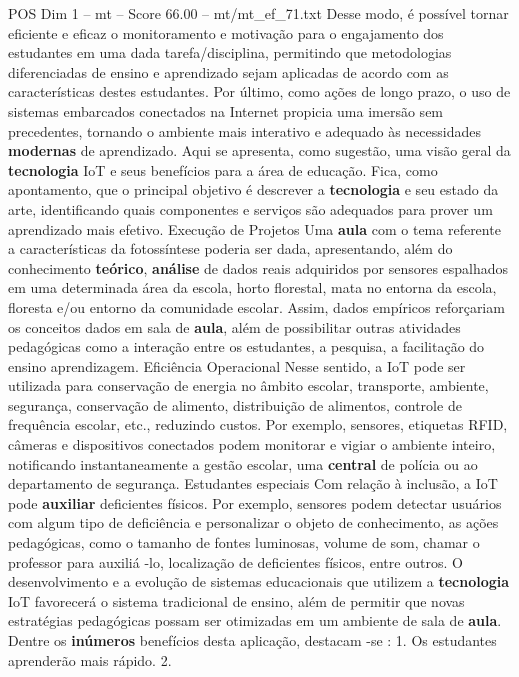 \begin{textsample}{POS Dim 1 – mt – Score 66.00 – mt/mt\_ef\_71.txt}
Desse modo, é possível tornar eficiente e eficaz o monitoramento e motivação para o engajamento dos estudantes em uma dada tarefa/disciplina, permitindo que metodologias diferenciadas de ensino e aprendizado sejam aplicadas de acordo com as características destes estudantes.
Por último, como ações de longo prazo, o uso de sistemas embarcados conectados na Internet propicia uma imersão sem precedentes, tornando o ambiente mais interativo e adequado às necessidades \textbf{modernas} de aprendizado.
Aqui se apresenta, como sugestão, uma visão geral da \textbf{tecnologia} IoT e seus benefícios para a área de educação.
Fica, como apontamento, que o principal objetivo é descrever a \textbf{tecnologia} e seu estado da arte, identificando quais componentes e serviços são adequados para prover um aprendizado mais efetivo.
Execução de Projetos Uma \textbf{aula} com o tema referente a características da fotossíntese poderia ser dada, apresentando, além do conhecimento \textbf{teórico}, \textbf{análise} de dados reais adquiridos por sensores espalhados em uma determinada área da escola, horto florestal, mata no entorna da escola, floresta e/ou entorno da comunidade escolar.
Assim, dados empíricos reforçariam os conceitos dados em sala de \textbf{aula}, além de possibilitar outras atividades pedagógicas como a interação entre os estudantes, a pesquisa, a facilitação do ensino aprendizagem.
Eficiência Operacional Nesse sentido, a IoT pode ser utilizada para conservação de energia no âmbito escolar, transporte, ambiente, segurança, conservação de alimento, distribuição de alimentos, controle de frequência escolar, etc., reduzindo custos.
Por exemplo, sensores, etiquetas RFID, câmeras e dispositivos conectados podem monitorar e vigiar o ambiente inteiro, notificando instantaneamente a gestão escolar, uma \textbf{central} de polícia ou ao departamento de segurança.
Estudantes especiais Com relação à inclusão, a IoT pode \textbf{auxiliar} deficientes físicos.
Por exemplo, sensores podem detectar usuários com algum tipo de deficiência e personalizar o objeto de conhecimento, as ações pedagógicas, como o tamanho de fontes luminosas, volume de som, chamar o professor para auxiliá -lo, localização de deficientes físicos, entre outros.
O desenvolvimento e a evolução de sistemas educacionais que utilizem a \textbf{tecnologia} IoT favorecerá o sistema tradicional de ensino, além de permitir que novas estratégias pedagógicas possam ser otimizadas em um ambiente de sala de \textbf{aula}.
Dentre os \textbf{inúmeros} benefícios desta aplicação, destacam -se : 1.
Os estudantes aprenderão mais rápido. 2.

\end{textsample}
